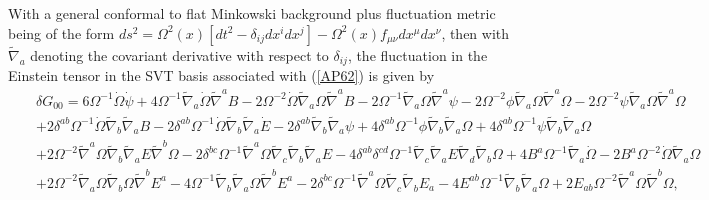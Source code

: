 \documentclass[aps]{revtex4}
\begin{document}
With a general conformal to flat Minkowski background plus fluctuation metric being of the form $ds^2=\Omega^2(x)[dt^2-\delta_{ij}dx^idx^j]-\Omega^2(x)f_{\mu\nu}dx^{\mu}dx^{\nu}$, then with $\tilde{\nabla}_{a}$ denoting the covariant derivative with respect to  $\delta_{ij}$, the fluctuation in the Einstein tensor in the SVT basis associated with (\ref{AP62}) is given by 
%
\begin{eqnarray}
&&\delta G_{00}=6 \Omega^{-1} \dot{\Omega} \dot{\psi} + 4 \Omega^{-1} \tilde{\nabla}_{a}\dot{\Omega} \tilde{\nabla}^{a}B - 2 \Omega^{-2} \dot{\Omega} \tilde{\nabla}_{a}\Omega \tilde{\nabla}^{a}B - 2 \Omega^{-1} \tilde{\nabla}_{a}\Omega \tilde{\nabla}^{a}\psi - 2 \Omega^{-2} \phi \tilde{\nabla}_{a}\Omega \tilde{\nabla}^{a}\Omega - 2 \Omega^{-2} \psi \tilde{\nabla}_{a}\Omega \tilde{\nabla}^{a}\Omega 
\nonumber\\
&&+ 2 \delta^{ab} \Omega^{-1} \dot{\Omega} \tilde{\nabla}_{b}\tilde{\nabla}_{a}B - 2 \delta^{ab} \Omega^{-1} \dot{\Omega} \tilde{\nabla}_{b}\tilde{\nabla}_{a}\dot{E} - 2 \delta^{ab} \tilde{\nabla}_{b}\tilde{\nabla}_{a}\psi + 4 \delta^{ab} \Omega^{-1} \phi \tilde{\nabla}_{b}\tilde{\nabla}_{a}\Omega + 4 \delta^{ab} \Omega^{-1} \psi \tilde{\nabla}_{b}\tilde{\nabla}_{a}\Omega 
\nonumber\\
&&+ 2 \Omega^{-2} \tilde{\nabla}^{a}\Omega \tilde{\nabla}_{b}\tilde{\nabla}_{a}E \tilde{\nabla}^{b}\Omega 
- 2 \delta^{bc} \Omega^{-1} \tilde{\nabla}^{a}\Omega \tilde{\nabla}_{c}\tilde{\nabla}_{b}\tilde{\nabla}_{a}E - 4 \delta^{ab} \delta^{cd} \Omega^{-1} \tilde{\nabla}_{c}\tilde{\nabla}_{a}E \tilde{\nabla}_{d}\tilde{\nabla}_{b}\Omega
+4 B^{a} \Omega^{-1} \tilde{\nabla}_{a}\dot{\Omega} - 2 B^{a} \Omega^{-2} \dot{\Omega} \tilde{\nabla}_{a}\Omega 
\nonumber\\
&&+ 2 \Omega^{-2} \tilde{\nabla}_{a}\Omega \tilde{\nabla}_{b}\Omega \tilde{\nabla}^{b}E^{a} - 4 \Omega^{-1} \tilde{\nabla}_{b}\tilde{\nabla}_{a}\Omega \tilde{\nabla}^{b}E^{a} - 2 \delta^{bc} \Omega^{-1} \tilde{\nabla}^{a}\Omega \tilde{\nabla}_{c}\tilde{\nabla}_{b}E_{a}-4 E^{ab} \Omega^{-1} \tilde{\nabla}_{b}\tilde{\nabla}_{a}\Omega + 2 E_{ab} \Omega^{-2} \tilde{\nabla}^{a}\Omega \tilde{\nabla}^{b}\Omega,
\label{C1}
\end{eqnarray}
%
%
\end{document}
